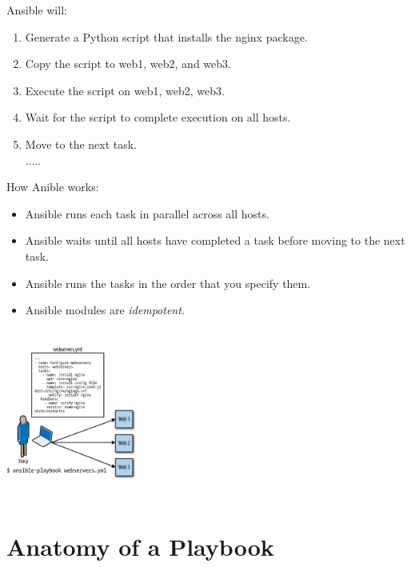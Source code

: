 \documentclass[pdf, 8pt, unicode, t]{beamer} %
\begin{document}
\begin{frame}
\hspace{2em}\alert{Ansible will:}

\begin{enumerate}
\addtolength{\itemindent}{1em}
\item Generate a Python script that installs the nginx package.
\item Copy the script to web1, web2, and web3.
\item Execute the script on web1, web2, web3.
\item Wait for the script to complete execution on all hosts.
\item Move to the next task.\\
.....
\end{enumerate}

\hspace{2em}\alert{How Anible works:}

\begin{itemize}
\item Ansible runs each task in parallel across all hosts.
\item Ansible waits until all hosts have completed a task before moving to the next task.
\item Ansible runs the tasks in the order that you specify them.
\item Ansible modules are {\it idempotent}.
\end{itemize}
\begin{center}
\vspace{-1.2em}
{\includegraphics[width=0.32\textwidth]{./images/scheme.pdf}}
\end{center}

\end{frame}


\section{Anatomy of a Playbook}
\end{document}

